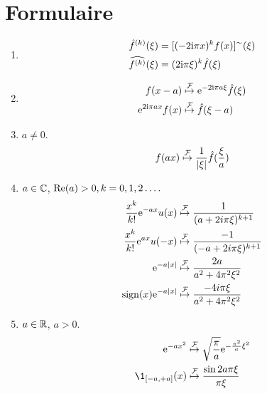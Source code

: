 \section{Formulaire}
\label{sec:formulaire}
\begin{enumerate}[label=(\roman*)]
\item
\begin{align*}
\hat{f}^{(k)}(\xi)&=[(-2\mathrm{i}\pi x)^{k}f(x)]^{\sim}(\xi)\\
\widehat{f^{(k)}}(\xi)&=(2\mathrm{i} \pi\xi)^{k}\hat{f}(\xi)
\end{align*}
\item
\begin{align*}
f(x-a) &\stackrel{\mathcal{F}}{\mapsto} \mathrm{e}^{-2\mathrm{i} \pi a\xi}\hat{f}(\xi) \\
\mathrm{e}^{2 \mathrm{i} \pi ax}f(x)&\stackrel{\mathcal{F}}{\mapsto} \hat{f}(\xi-a) \\
\end{align*}
\item $a\neq 0$.
$$ f(ax)\stackrel{\mathcal{F}}{\mapsto} \frac{1}{|\xi|}\hat{f}(\frac{\xi}{a})$$
\item  $a\in \mathbb{C}$, ${\rm Re}(a)>0, k=0,1,2\ldots.$
\begin{align*}
\frac{x^{k}}{k!}\mathrm{e}^{-ax}u(x) &\stackrel{\mathcal{F}}{\mapsto} \frac{1}{(a+2i\pi\xi)^{k+1}} \\
\frac{x^{k}}{k!}\mathrm{e}^{ax}u(-x) &\stackrel{\mathcal{F}}{\mapsto} \frac{-1}{(-a+2i\pi\xi)^{k+1}} \\
\mathrm{e}^{-a|x|} &\stackrel{\mathcal{F}}{\mapsto} \frac{2a}{a^{2}+4\pi^{2}\xi^{2}} \\
\mathrm{sign}(x)\mathrm{e}^{-a|x|} &\stackrel{\mathcal{F}}{\mapsto} \frac{-4i\pi\xi}{a^{2}+4\pi^{2}\xi^{2}} \\
\end{align*}
\item  $a\in \mathbb{R}$, $a>0$.
\begin{align*}
\rme^{-ax^{2}}  &\TFyield \sqrt{\frac{\pi}{a}}\rme^{-\frac{\pi^{2}}{a}\xi^{2}} \\
\1_{\ccint{-a,+a}}(x) &\TFyield \frac{\sin 2a\pi\xi}{\pi\xi}
\end{align*}
\end{enumerate}
